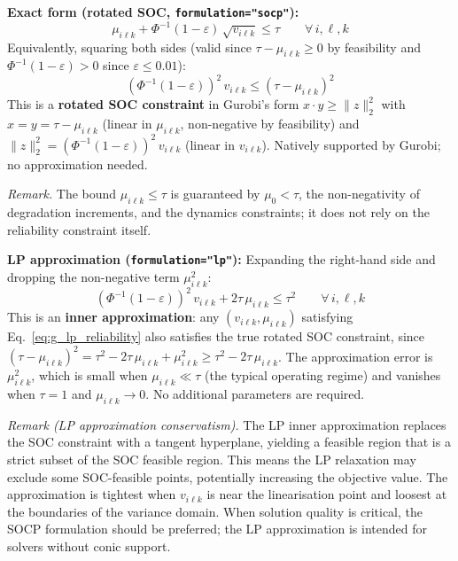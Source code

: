 \documentclass[11pt,a4paper]{article}
\begin{document}
\textbf{Exact form (rotated SOC, \texttt{formulation="socp"}):}
\begin{equation}
  \mu_{i\ell k} + \Phi^{-1}(1-\varepsilon)\,\sqrt{v_{i\ell k}} \leq \tau
  \qquad \forall\, i,\ell,k
\end{equation}
Equivalently, squaring both sides (valid since $\tau - \mu_{i\ell k} \geq 0$ by feasibility
and $\Phi^{-1}(1-\varepsilon) > 0$ since $\varepsilon \leq 0.01$):
\begin{equation}
  (\Phi^{-1}(1-\varepsilon))^2\,v_{i\ell k} \leq (\tau - \mu_{i\ell k})^2
\end{equation}
This is a \textbf{rotated SOC constraint} in Gurobi's form $x \cdot y \geq \|z\|_2^2$ with
$x = y = \tau - \mu_{i\ell k}$ (linear in $\mu_{i\ell k}$, non-negative by feasibility)
and $\|z\|_2^2 = (\Phi^{-1}(1-\varepsilon))^2\,v_{i\ell k}$ (linear in $v_{i\ell k}$).
Natively supported by Gurobi; no approximation needed.

\emph{Remark.} The bound $\mu_{i\ell k} \leq \tau$ is guaranteed by $\mu_0 < \tau$,
the non-negativity of degradation increments, and the dynamics constraints;
it does not rely on the reliability constraint itself.

\textbf{LP approximation (\texttt{formulation="lp"}):}
Expanding the right-hand side and dropping the non-negative term $\mu_{i\ell k}^2$:
\begin{equation}
  (\Phi^{-1}(1-\varepsilon))^2\,v_{i\ell k} + 2\tau\,\mu_{i\ell k} \leq \tau^2
  \qquad \forall\, i,\ell,k
  \label{eq:g_lp_reliability}
\end{equation}
This is an \textbf{inner approximation}: any $(v_{i\ell k}, \mu_{i\ell k})$ satisfying
Eq.~\eqref{eq:g_lp_reliability} also satisfies the true rotated SOC constraint,
since $(\tau - \mu_{i\ell k})^2 = \tau^2 - 2\tau\,\mu_{i\ell k} + \mu_{i\ell k}^2
\geq \tau^2 - 2\tau\,\mu_{i\ell k}$.
The approximation error is $\mu_{i\ell k}^2$, which is small when $\mu_{i\ell k} \ll \tau$
(the typical operating regime) and vanishes when $\tau = 1$ and $\mu_{i\ell k} \to 0$.
No additional parameters are required.

\emph{Remark (LP approximation conservatism).}
The LP inner approximation replaces the SOC constraint with a tangent hyperplane,
yielding a feasible region that is a strict subset of the SOC feasible region.
This means the LP relaxation may exclude some SOC-feasible points, potentially
increasing the objective value. The approximation is tightest when $v_{i\ell k}$
is near the linearisation point and loosest at the boundaries of the variance domain.
When solution quality is critical, the SOCP formulation should be preferred;
the LP approximation is intended for solvers without conic support.
\end{document}
